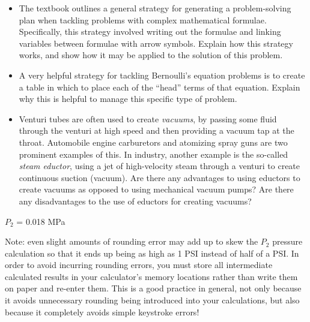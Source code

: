 \begin{itemize}
\item{} The textbook outlines a general strategy for generating a problem-solving plan when tackling problems with complex mathematical formulae.  Specifically, this strategy involved writing out the formulae and linking variables between formulae with arrow symbols.  Explain how this strategy works, and show how it may be applied to the solution of this problem.
\item{} A very helpful strategy for tackling Bernoulli's equation problems is to create a table in which to place each of the ``head'' terms of that equation.  Explain why this is helpful to manage this specific type of problem.
\item{} Venturi tubes are often used to create {\it vacuums}, by passing some fluid through the venturi at high speed and then providing a vacuum tap at the throat.  Automobile engine carburetors and atomizing spray guns are two prominent examples of this.  In industry, another example is the so-called {\it steam eductor}, using a jet of high-velocity steam through a venturi to create continuous suction (vacuum).  Are there any advantages to using eductors to create vacuums as opposed to using mechanical vacuum pumps?  Are there any disadvantages to the use of eductors for creating vacuums?
\end{itemize}







$P_2$ = 0.018 MPa 

\vskip 10pt

Note: even slight amounts of rounding error may add up to skew the $P_2$ pressure calculation so that it ends up being as high as 1 PSI instead of half of a PSI.  In order to avoid incurring rounding errors, you must store all intermediate calculated results in your calculator's memory locations rather than write them on paper and re-enter them.  This is a good practice in general, not only because it avoids unnecessary rounding being introduced into your calculations, but also because it completely avoids simple keystroke errors!








